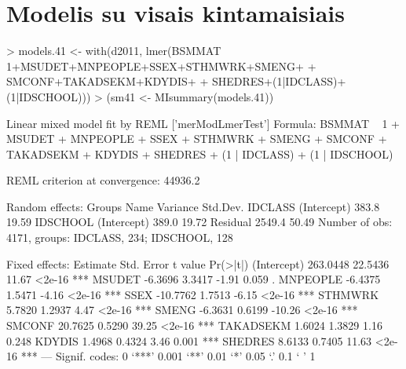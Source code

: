 \documentclass[a4paper]{article}
\begin{document}
\section{Modelis su visais kintamaisiais}

\begin{Schunk}
\begin{Sinput}
> models.41 <- with(d2011, lmer(BSMMAT ~ 1+MSUDET+MNPEOPLE+SSEX+STHMWRK+SMENG+
+                                 SMCONF+TAKADSEKM+KDYDIS+
+                                 SHEDRES+(1|IDCLASS)+(1|IDSCHOOL)))
> (sm41 <- MIsummary(models.41))
\end{Sinput}
\begin{Soutput}
Linear mixed model fit by REML ['merModLmerTest']
Formula: BSMMAT ~ 1 + MSUDET + MNPEOPLE + SSEX + STHMWRK + SMENG + SMCONF +      TAKADSEKM + KDYDIS + SHEDRES + (1 | IDCLASS) + (1 | IDSCHOOL) 

REML criterion at convergence: 44936.2 

Random effects:
 Groups   Name        Variance Std.Dev.
 IDCLASS  (Intercept)  383.8   19.59   
 IDSCHOOL (Intercept)  389.0   19.72   
 Residual             2549.4   50.49   
Number of obs: 4171, groups: IDCLASS, 234; IDSCHOOL, 128

Fixed effects:
            Estimate Std. Error t value Pr(>|t|)    
(Intercept) 263.0448    22.5436   11.67   <2e-16 ***
MSUDET       -6.3696     3.3417   -1.91    0.059 .  
MNPEOPLE     -6.4375     1.5471   -4.16   <2e-16 ***
SSEX        -10.7762     1.7513   -6.15   <2e-16 ***
STHMWRK       5.7820     1.2937    4.47   <2e-16 ***
SMENG        -6.3631     0.6199  -10.26   <2e-16 ***
SMCONF       20.7625     0.5290   39.25   <2e-16 ***
TAKADSEKM     1.6024     1.3829    1.16    0.248    
KDYDIS        1.4968     0.4324    3.46    0.001 ***
SHEDRES       8.6133     0.7405   11.63   <2e-16 ***
---
Signif. codes:  0 ‘***’ 0.001 ‘**’ 0.01 ‘*’ 0.05 ‘.’ 0.1 ‘ ’ 1


\end{Soutput}
\end{Schunk}
\end{document}
